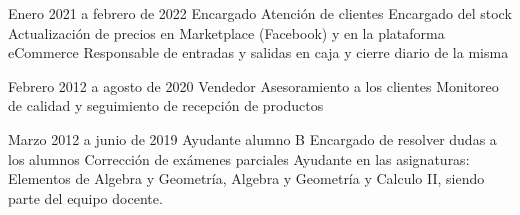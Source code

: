 \documentclass{CV_template}
\begin{document}
\begin{paracol}{2}
\begin{rightcolumn}

    {Enero 2021 a febrero de 2022}
    {Encargado}
    {Atención de clientes}
    {Encargado del stock}
    {Actualización de precios en Marketplace (Facebook) y en la plataforma eCommerce}
    {Responsable de entradas y salidas en caja y cierre diario de la misma}

    {Febrero 2012 a agosto de 2020}
    {Vendedor}
    {Asesoramiento a los clientes}
    {Monitoreo de calidad y seguimiento de recepción de productos}
    {}{}

    {Marzo 2012 a junio de 2019}
    {Ayudante alumno B}
    {Encargado de resolver dudas a los alumnos}
    {Corrección de exámenes parciales}
    {Ayudante en las asignaturas: Elementos de Algebra y Geometría, Algebra y Geometría y Calculo II, siendo parte del equipo docente.}
    {}


\end{rightcolumn}

\end{paracol}
\end{document}
